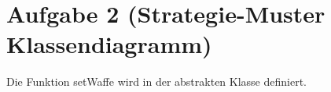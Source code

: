 \section{Aufgabe 2 (Strategie-Muster Klassendiagramm)}


Die Funktion setWaffe wird in der abstrakten Klasse  definiert.

\clearpage
